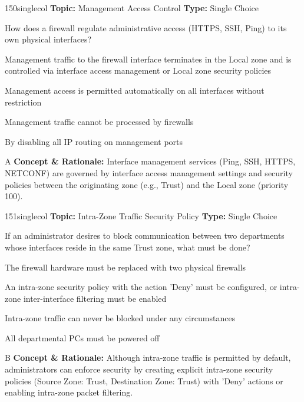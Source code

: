 \begin{qcard}{150}{singlecol}
\textcolor{darkslate!75}{\small\textbf{Topic:} Management Access Control \hfill \textbf{Type:} Single Choice}\vspace{0.4em}\par
How does a firewall regulate administrative access (HTTPS, SSH, Ping) to its own physical interfaces?
\begin{qoptions}
\item Management traffic to the firewall interface terminates in the Local zone and is controlled via interface access management or Local zone security policies
\item Management access is permitted automatically on all interfaces without restriction
\item Management traffic cannot be processed by firewalls
\item By disabling all IP routing on management ports
\end{qoptions}
\end{qcard}
\nopagebreak
\begin{explainbox}{A}
\textbf{Concept \& Rationale:} Interface management services (Ping, SSH, HTTPS, NETCONF) are governed by interface access management settings and security policies between the originating zone (e.g., Trust) and the Local zone (priority 100).
\end{explainbox}

\begin{qcard}{151}{singlecol}
\textcolor{darkslate!75}{\small\textbf{Topic:} Intra-Zone Traffic Security Policy \hfill \textbf{Type:} Single Choice}\vspace{0.4em}\par
If an administrator desires to block communication between two departments whose interfaces reside in the same Trust zone, what must be done?
\begin{qoptions}
\item The firewall hardware must be replaced with two physical firewalls
\item An intra-zone security policy with the action 'Deny' must be configured, or intra-zone inter-interface filtering must be enabled
\item Intra-zone traffic can never be blocked under any circumstances
\item All departmental PCs must be powered off
\end{qoptions}
\end{qcard}
\nopagebreak
\begin{explainbox}{B}
\textbf{Concept \& Rationale:} Although intra-zone traffic is permitted by default, administrators can enforce security by creating explicit intra-zone security policies (Source Zone: Trust, Destination Zone: Trust) with 'Deny' actions or enabling intra-zone packet filtering.
\end{explainbox}

